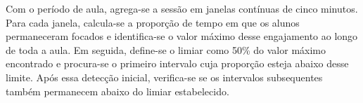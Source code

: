 Com o período de aula, agrega-se a sessão em janelas contínuas de cinco minutos. Para cada janela, calcula-se a proporção de tempo em que os alunos permaneceram focados e identifica-se o valor máximo desse engajamento ao longo de toda a aula. Em seguida, define-se o limiar como 50\% do valor máximo encontrado e procura-se o primeiro intervalo cuja proporção esteja abaixo desse limite. Após essa detecção inicial, verifica-se se os intervalos subsequentes também permanecem abaixo do limiar estabelecido.



% 


